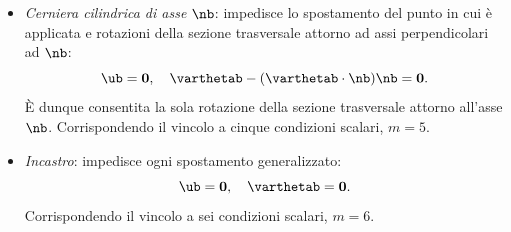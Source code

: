\begin{itemize}
\begin{equation}
	\ub- (\ub\cdot\nb)\nb=\mathbf{0}, \quad \varthetab=\mathbf{0}.
\end{equation}
È dunque consentito il solo spostamento nella direzione $\nb$. Corrispondendo il vincolo a cinque  condizioni scalari, $m=5$.
\item \emph{Cerniera cilindrica di asse $\nb$}: impedisce lo spostamento del punto in cui è applicata e rotazioni della sezione trasversale attorno ad assi perpendicolari ad $\nb$:
\begin{equation}
	\ub=\mathbf{0}, \quad \varthetab- (\varthetab\cdot\nb)\nb=\mathbf{0}.
\end{equation}
È dunque consentita la sola rotazione della sezione trasversale attorno all'asse $\nb$. Corrispondendo il vincolo a cinque  condizioni scalari, $m=5$.
\item \emph{Incastro}: impedisce ogni spostamento generalizzato:
\begin{equation}
	\ub=\mathbf{0}, \quad \varthetab=\mathbf{0}.
\end{equation}
Corrispondendo il vincolo a sei  condizioni scalari, $m=6$.
\end{itemize}

